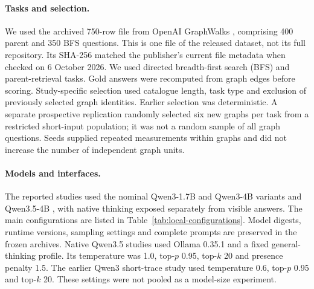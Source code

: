 \paragraph{Tasks and selection.} We used the archived 750-row \protect{} file from OpenAI GraphWalks \citep{openai2025graphwalks}, comprising 400 parent and 350 BFS questions. This is one file of the released dataset, not its full repository. Its SHA-256 matched the publisher's current file metadata when checked on 6 October 2026. We used directed breadth-first search (BFS) and parent-retrieval tasks. Gold answers were recomputed from graph edges before scoring. Study-specific selection used catalogue length, task type and exclusion of previously selected graph identities. Earlier selection was deterministic. A separate prospective replication randomly selected six new graphs per task from a restricted short-input population; it was not a random sample of all graph questions. Seeds supplied repeated measurements within graphs and did not increase the number of independent graph units.

\paragraph{Models and interfaces.} The reported studies used the nominal Qwen3-1.7B and Qwen3-4B variants \citep{yang2025qwen3} and Qwen3.5-4B \citep{qwen2026qwen35card}, with native thinking exposed separately from visible answers. The main configurations are listed in Table~\ref{tab:local-configurations}. Model digests, runtime versions, sampling settings and complete prompts are preserved in the frozen archives. Native Qwen3.5 studies used Ollama 0.35.1 and a fixed general-thinking profile. Its temperature was 1.0, top-$p$ 0.95, top-$k$ 20 and presence penalty 1.5. The earlier Qwen3 short-trace study used temperature 0.6, top-$p$ 0.95 and top-$k$ 20. These settings were not pooled as a model-size experiment.

